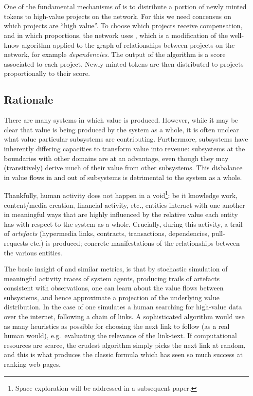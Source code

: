 \section{\osrank{}}

\def\Graph{\mathsf{Graph}}

One of the fundamental mechanisms of \oscoin{} is to distribute a
portion of newly minted tokens to high-value projects on the
network. For this we need concensus on which projects are ``high
value''.  To choose which projects receive compensation, and in which
proportions, the network uses \osrank{}, which is a modification of
the well-know \pagerank{} algorithm \cite{pagerank} applied to the
graph of relationships between projects on the network, for example
\emph{dependencies}. The output of the algorithm is a score associated
to each project. Newly minted tokens are then distributed to projects
proportionally to their score.

\subsection{Rationale}

There are many systems in which value is produced. However, while it
may be clear that value is being produced by the system as a whole, it
is often unclear what value particular subsystems are
contributing. Furthermore, subsystems have inherently differing
capacities to transform value into revenue: subsystems at the
boundaries with other domains are at an advantage, even though they
may (transitively) derive much of their value from other
subsystems. This disbalance in value flows in and out of subsystems is
detrimental to the system as a whole.

Thankfully, human activity does not happen in a void\footnote{Space
  exploration will be addressed in a subsequent paper.}: be it
knowledge work, content/media creation, financial activity, etc.,
entities interact with one another in meaningful ways that are highly
influenced by the relative value each entity has with respect to the
system as a whole. Crucially, during this activity, a trail of
\emph{artefacts} (hypermedia links, contracts, transactions,
dependencies, pull-requests etc.) is produced; concrete manifestations
of the relationships between the various entities.

The basic insight of \pagerank{} and similar metrics, is that by
stochastic simulation of meaningful activity traces of system agents,
producing trails of artefacts consistent with observations, one can
learn about the value flows between subsystems, and hence approximate
a projection of the underlying value distribution. In the case of
\pagerank{} one simulates a human searching for high-value data over
the internet, following a chain of links. A sophisticated algorithm
would use as many heuristics as possible for choosing the next link to
follow (as a real human would), e.g.\ evaluating the relevance of the
link-text. If computational resources are scarce, the crudest
algorithm simply picks the next link at random, and this is what
produces the classic \pagerank{} formula which has seen so much
success at ranking web pages.

